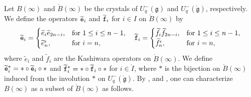 \documentclass[leqno,11pt]{amsart}
\numberwithin{equation}{section}
\newcommand{\te}{\widetilde{e}}
\newcommand{\tf}{\widetilde{f}}
\newcommand{\g}{\mathfrak{g}}
\newcommand{\td}{\widetilde}
\begin{document}
Let $B(\infty)$ and $\mathring{B}(\infty)$ be the crystals of $U^-_q(\g)$ and $U^-_q(\mathring{\g})$, respectively. 
We define the operators $\td{\tt e}_i$ and $\td{\tt f}_i$ for $i\in I$ on $\mathring{B}(\infty)$ by
\begin{equation*}
\td{\tt e}_i = 
\begin{cases}
\te_i\te_{2n-i}, & \text{for $1\leq i\leq n-1$},\\
\te_n^\epsilon, & \text{for $i=n$},
\end{cases}\quad
\td{\tt f}_i = 
\begin{cases}
\tf_i\tf_{2n-i}, & \text{for $1\leq i\leq n-1$},\\
\tf_n^\epsilon, & \text{for $i=n$},
\end{cases}
\end{equation*}
where $\te_i$ and $\tf_i$ are the Kashiwara operators on $\mathring{B}(\infty)$.
We define $\td{\tt e}^\ast_i=\ast \circ \td{\tt e}_i\circ \ast$ and 
$\td{\tt f}^\ast_i=\ast \circ \td{\tt f}_i\circ \ast$ for $i\in \mathring{I}$, where $\ast$ is the bijection on $\mathring{B}(\infty)$ induced from the involution $\ast$ on $U_q^-(\mathring{\g})$.
By \cite[Theorem 5.1]{Kas96}, \cite[Proposition 3.2]{NS03} and \cite[Theorem 2.3.1]{NS05}, one can characterize $B(\infty)$ as a subset of $\mathring{B}(\infty)$ as follows.
\end{document}
